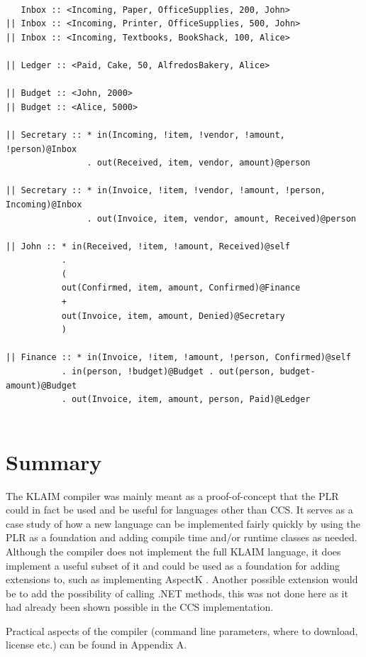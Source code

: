   
  \begin{verbatim}
  
   Inbox :: <Incoming, Paper, OfficeSupplies, 200, John>
|| Inbox :: <Incoming, Printer, OfficeSupplies, 500, John>  
|| Inbox :: <Incoming, Textbooks, BookShack, 100, Alice>  

|| Ledger :: <Paid, Cake, 50, AlfredosBakery, Alice>

|| Budget :: <John, 2000>
|| Budget :: <Alice, 5000>
  
|| Secretary :: * in(Incoming, !item, !vendor, !amount,  !person)@Inbox 
                . out(Received, item, vendor, amount)@person

|| Secretary :: * in(Invoice, !item, !vendor, !amount, !person, Incoming)@Inbox 
                . out(Invoice, item, vendor, amount, Received)@person

|| John :: * in(Received, !item, !amount, Received)@self
           . 
           (
           out(Confirmed, item, amount, Confirmed)@Finance
           +
           out(Invoice, item, amount, Denied)@Secretary
           )

|| Finance :: * in(Invoice, !item, !amount, !person, Confirmed)@self
           . in(person, !budget)@Budget . out(person, budget-amount)@Budget
           . out(Invoice, item, amount, person, Paid)@Ledger
           
  \end{verbatim}	

\section{Summary}

	The KLAIM compiler was mainly meant as a proof-of-concept that the PLR could 
	in fact be used and be useful for languages other than CCS. It serves as a 
	case study of how a new language can be implemented fairly quickly by using 
	the PLR as a foundation and adding compile time and/or runtime classes as 
	needed. Although the compiler does not implement the full KLAIM language, it 
	does implement a useful subset of it and could be used as a foundation for 
	adding extensions to, such as implementing AspectK \cite{aspectk}. Another 
	possible extension would be to add the possibility of calling .NET methods, 
	this was not done here as it had already been shown possible in the CCS 
	implementation.
	
	Practical aspects of the compiler (command line parameters, where to 
	download, license etc.) can be found in Appendix A.
